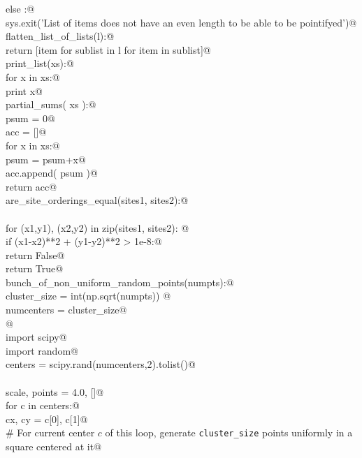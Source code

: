 \documentclass[12.0pt]{report}
\begin{document}
\begin{appendices}
\begin{flushleft}
\begin{list}{}{}
\mbox{}\verb@    else :@\\
\mbox{}\verb@        sys.exit('List of items does not have an even length to be able to be pointifyed')@\\
\mbox{}\verb@def flatten_list_of_lists(l):@\\
\mbox{}\verb@       return [item for sublist in l for item in sublist]@\\
\mbox{}\verb@def print_list(xs):@\\
\mbox{}\verb@    for x in xs:@\\
\mbox{}\verb@        print x@\\
\mbox{}\verb@def partial_sums( xs ):@\\
\mbox{}\verb@    psum = 0@\\
\mbox{}\verb@    acc = []@\\
\mbox{}\verb@    for x in xs:@\\
\mbox{}\verb@        psum = psum+x@\\
\mbox{}\verb@        acc.append( psum )@\\
\mbox{}\verb@    return acc@\\
\mbox{}\verb@def are_site_orderings_equal(sites1, sites2):@\\
\mbox{}\verb@@\\
\mbox{}\verb@    for (x1,y1), (x2,y2) in zip(sites1, sites2): @\\
\mbox{}\verb@        if (x1-x2)**2 + (y1-y2)**2 > 1e-8:@\\
\mbox{}\verb@            return False@\\
\mbox{}\verb@    return True@\\
\mbox{}\verb@def bunch_of_non_uniform_random_points(numpts):@\\
\mbox{}\verb@    cluster_size = int(np.sqrt(numpts)) @\\
\mbox{}\verb@    numcenters   = cluster_size@\\
\mbox{}\verb@    @\\
\mbox{}\verb@    import scipy@\\
\mbox{}\verb@    import random@\\
\mbox{}\verb@    centers = scipy.rand(numcenters,2).tolist()@\\
\mbox{}\verb@@\\
\mbox{}\verb@    scale, points = 4.0, []@\\
\mbox{}\verb@    for c in centers:@\\
\mbox{}\verb@        cx, cy = c[0], c[1]@\\
\mbox{}\verb@        # For current center $c$ of this loop, generate \verb|cluster_size| points uniformly in a square centered at it@\\

\end{list}
\end{flushleft}
\end{appendices}
\end{document}
